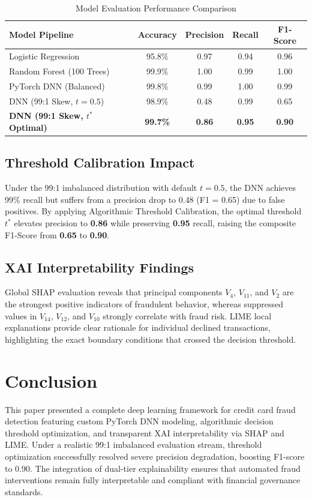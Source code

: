 \documentclass[conference]{IEEEtran}
\begin{document}
\begin{table}[htbp]
\caption{Model Evaluation Performance Comparison}
\label{tab:results}
\centering
\begin{tabular}{lcccc}
\toprule
\textbf{Model Pipeline} & \textbf{Accuracy} & \textbf{Precision} & \textbf{Recall} & \textbf{F1-Score} \\
\midrule
Logistic Regression & 95.8\% & 0.97 & 0.94 & 0.96 \\
Random Forest (100 Trees) & 99.9\% & 1.00 & 0.99 & 1.00 \\
PyTorch DNN (Balanced) & 99.8\% & 0.99 & 1.00 & 0.99 \\
DNN (99:1 Skew, $t=0.5$) & 98.9\% & 0.48 & 0.99 & 0.65 \\
\textbf{DNN (99:1 Skew, $t^*$ Optimal)} & \textbf{99.7\%} & \textbf{0.86} & \textbf{0.95} & \textbf{0.90} \\
\bottomrule
\end{tabular}
\end{table}

\subsection{Threshold Calibration Impact}
Under the 99:1 imbalanced distribution with default $t = 0.5$, the DNN achieves 99\% recall but suffers from a precision drop to 0.48 (F1 = 0.65) due to false positives. By applying Algorithmic Threshold Calibration, the optimal threshold $t^*$ elevates precision to \textbf{0.86} while preserving \textbf{0.95} recall, raising the composite F1-Score from \textbf{0.65} to \textbf{0.90}.

\subsection{XAI Interpretability Findings}
Global SHAP evaluation reveals that principal components $V_4$, $V_{11}$, and $V_2$ are the strongest positive indicators of fraudulent behavior, whereas suppressed values in $V_{14}$, $V_{12}$, and $V_{10}$ strongly correlate with fraud risk. LIME local explanations provide clear rationale for individual declined transactions, highlighting the exact boundary conditions that crossed the decision threshold.

\section{Conclusion}
This paper presented a complete deep learning framework for credit card fraud detection featuring custom PyTorch DNN modeling, algorithmic decision threshold optimization, and transparent XAI interpretability via SHAP and LIME. Under a realistic 99:1 imbalanced evaluation stream, threshold optimization successfully resolved severe precision degradation, boosting F1-score to 0.90. The integration of dual-tier explainability ensures that automated fraud interventions remain fully interpretable and compliant with financial governance standards.
\end{document}

